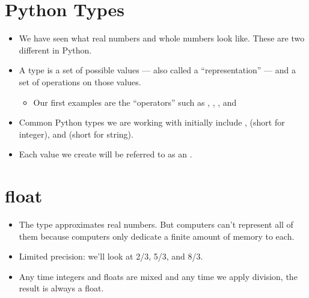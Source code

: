 \documentclass[letterpaper,10pt,english]{sphinxmanual}
\begin{document}
\section{Python Types}
\label{\detokenize{lecture_notes/lec02_calculator:python-types}}\begin{itemize}
\item {} 
We have seen what real numbers and whole numbers look like. These
are two different  in Python.

\item {} 
A type is a set of possible values — also called a “representation” —
and a set of operations on those values.
\begin{itemize}
\item {} 
Our first examples are the “operators” such as \sphinxcode{\sphinxupquote{+}}, \sphinxcode{\sphinxupquote{-}}, \sphinxcode{\sphinxupquote{*}}, \sphinxcode{\sphinxupquote{/}} and \sphinxcode{\sphinxupquote{**}}

\end{itemize}

\item {} 
Common Python types we are working with initially include
,  (short for integer), and  (short for string).

\item {} 
Each value we create will be referred to as an .

\end{itemize}


\section{float}
\label{\detokenize{lecture_notes/lec02_calculator:float}}\begin{itemize}
\item {} 
The  type approximates real numbers.  But computers can’t
represent all of them because computers only dedicate a finite
amount of memory to each.

\item {} 
Limited precision:  we’ll look at 2/3, 5/3, and 8/3.

\item {} 
Any time integers and floats are mixed and any time we apply
division, the result is always a float.

\end{itemize}
\end{document}
